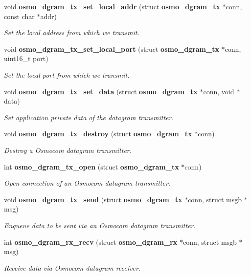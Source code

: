 \begin{DoxyCompactItemize}
void {\bf osmo\+\_\+dgram\+\_\+tx\+\_\+set\+\_\+local\+\_\+addr} (struct {\bf osmo\+\_\+dgram\+\_\+tx} $\ast$conn, const char $\ast$addr)
\begin{DoxyCompactList}\small\item\em Set the local address from which we transmit. \end{DoxyCompactList}\item 
void {\bf osmo\+\_\+dgram\+\_\+tx\+\_\+set\+\_\+local\+\_\+port} (struct {\bf osmo\+\_\+dgram\+\_\+tx} $\ast$conn, uint16\+\_\+t port)
\begin{DoxyCompactList}\small\item\em Set the local port from which we transmit. \end{DoxyCompactList}\item 
void {\bf osmo\+\_\+dgram\+\_\+tx\+\_\+set\+\_\+data} (struct {\bf osmo\+\_\+dgram\+\_\+tx} $\ast$conn, void $\ast$data)
\begin{DoxyCompactList}\small\item\em Set application private data of the datagram transmitter. \end{DoxyCompactList}\item 
void {\bf osmo\+\_\+dgram\+\_\+tx\+\_\+destroy} (struct {\bf osmo\+\_\+dgram\+\_\+tx} $\ast$conn)
\begin{DoxyCompactList}\small\item\em Destroy a Osmocom datagram transmitter. \end{DoxyCompactList}\item 
int {\bf osmo\+\_\+dgram\+\_\+tx\+\_\+open} (struct {\bf osmo\+\_\+dgram\+\_\+tx} $\ast$conn)
\begin{DoxyCompactList}\small\item\em Open connection of an Osmocom datagram transmitter. \end{DoxyCompactList}\item 
void {\bf osmo\+\_\+dgram\+\_\+tx\+\_\+send} (struct {\bf osmo\+\_\+dgram\+\_\+tx} $\ast$conn, struct msgb $\ast$msg)
\begin{DoxyCompactList}\small\item\em Enqueue data to be sent via an Osmocom datagram transmitter. \end{DoxyCompactList}\item 
int {\bf osmo\+\_\+dgram\+\_\+rx\+\_\+recv} (struct {\bf osmo\+\_\+dgram\+\_\+rx} $\ast$conn, struct msgb $\ast$msg)
\begin{DoxyCompactList}\small\item\em Receive data via Osmocom datagram receiver. \end{DoxyCompactList}\item 

\end{DoxyCompactItemize}
